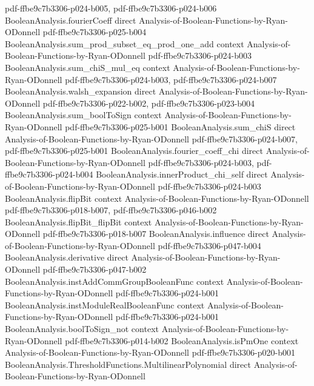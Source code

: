 \begin{lemma}
  {pdf-ffbe9c7b3306-p024-b005,
    pdf-ffbe9c7b3306-p024-b006}
\proofstep
  {BooleanAnalysis.fourierCoeff}
  {direct}
  {Analysis-of-Boolean-Functions-by-Ryan-ODonnell}
  {pdf-ffbe9c7b3306-p025-b004}
\proofstep
  {BooleanAnalysis.sum_prod_subset_eq_prod_one_add}
  {context}
  {Analysis-of-Boolean-Functions-by-Ryan-ODonnell}
  {pdf-ffbe9c7b3306-p024-b003}
\proofstep
  {BooleanAnalysis.sum_chiS_mul_eq}
  {context}
  {Analysis-of-Boolean-Functions-by-Ryan-ODonnell}
  {pdf-ffbe9c7b3306-p024-b003,
    pdf-ffbe9c7b3306-p024-b007}
\proofstep
  {BooleanAnalysis.walsh_expansion}
  {direct}
  {Analysis-of-Boolean-Functions-by-Ryan-ODonnell}
  {pdf-ffbe9c7b3306-p022-b002,
    pdf-ffbe9c7b3306-p023-b004}
\proofstep
  {BooleanAnalysis.sum_boolToSign}
  {context}
  {Analysis-of-Boolean-Functions-by-Ryan-ODonnell}
  {pdf-ffbe9c7b3306-p025-b001}
\proofstep
  {BooleanAnalysis.sum_chiS}
  {direct}
  {Analysis-of-Boolean-Functions-by-Ryan-ODonnell}
  {pdf-ffbe9c7b3306-p024-b007,
    pdf-ffbe9c7b3306-p025-b001}
\proofstep
  {BooleanAnalysis.fourier_coeff_chi}
  {direct}
  {Analysis-of-Boolean-Functions-by-Ryan-ODonnell}
  {pdf-ffbe9c7b3306-p024-b003,
    pdf-ffbe9c7b3306-p024-b004}
\proofstep
  {BooleanAnalysis.innerProduct_chi_self}
  {direct}
  {Analysis-of-Boolean-Functions-by-Ryan-ODonnell}
  {pdf-ffbe9c7b3306-p024-b003}
\proofstep
  {BooleanAnalysis.flipBit}
  {context}
  {Analysis-of-Boolean-Functions-by-Ryan-ODonnell}
  {pdf-ffbe9c7b3306-p018-b007,
    pdf-ffbe9c7b3306-p046-b002}
\proofstep
  {BooleanAnalysis.flipBit_flipBit}
  {context}
  {Analysis-of-Boolean-Functions-by-Ryan-ODonnell}
  {pdf-ffbe9c7b3306-p018-b007}
\proofstep
  {BooleanAnalysis.influence}
  {direct}
  {Analysis-of-Boolean-Functions-by-Ryan-ODonnell}
  {pdf-ffbe9c7b3306-p047-b004}
\proofstep
  {BooleanAnalysis.derivative}
  {direct}
  {Analysis-of-Boolean-Functions-by-Ryan-ODonnell}
  {pdf-ffbe9c7b3306-p047-b002}
\proofstep
  {BooleanAnalysis.instAddCommGroupBooleanFunc}
  {context}
  {Analysis-of-Boolean-Functions-by-Ryan-ODonnell}
  {pdf-ffbe9c7b3306-p024-b001}
\proofstep
  {BooleanAnalysis.instModuleRealBooleanFunc}
  {context}
  {Analysis-of-Boolean-Functions-by-Ryan-ODonnell}
  {pdf-ffbe9c7b3306-p024-b001}
\proofstep
  {BooleanAnalysis.boolToSign_not}
  {context}
  {Analysis-of-Boolean-Functions-by-Ryan-ODonnell}
  {pdf-ffbe9c7b3306-p014-b002}
\proofstep
  {BooleanAnalysis.isPmOne}
  {context}
  {Analysis-of-Boolean-Functions-by-Ryan-ODonnell}
  {pdf-ffbe9c7b3306-p020-b001}
\proofstep
  {BooleanAnalysis.ThresholdFunctions.MultilinearPolynomial}
  {direct}
  {Analysis-of-Boolean-Functions-by-Ryan-ODonnell}

\end{lemma}
